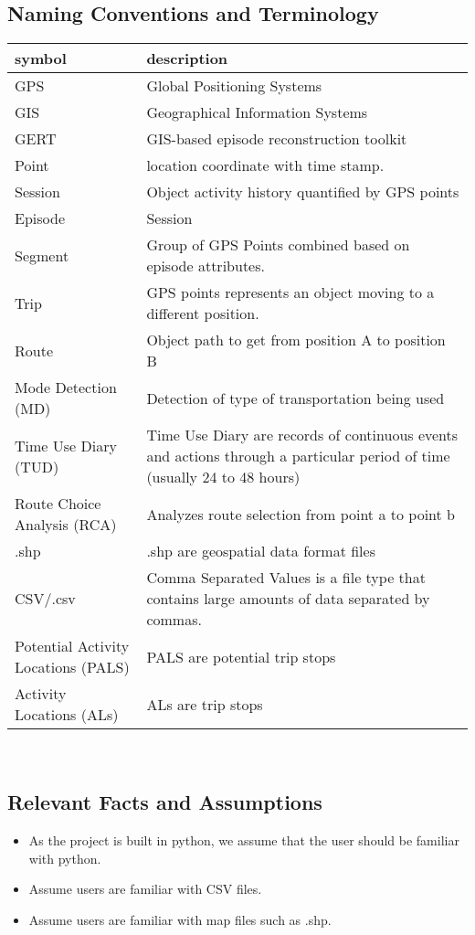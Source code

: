 \documentclass[12pt, titlepage]{article}
\begin{document}
\subsection{Naming Conventions and Terminology}
\begin{tabular}{l p{6cm}} 
  \toprule		
  \textbf{symbol} & \textbf{description}\\
  \midrule 
  GPS & Global Positioning Systems\\
  GIS & Geographical Information Systems\\
  GERT & GIS-based episode reconstruction toolkit \\
  Point & location coordinate with time stamp.\\
  Session & Object activity history quantified by GPS points \\
  Episode & Session\\
  Segment & Group of GPS Points combined based on episode attributes.\\
  Trip & GPS points represents an object moving to a different position.\\
  Route & Object path to get from position A to position B\\
  Mode Detection (MD) & Detection of type of transportation being used \\
  Time Use Diary (TUD) & Time Use Diary are records of continuous events and actions through a particular period of time (usually 24 to 48 hours) \\
  Route Choice Analysis (RCA) &  Analyzes route selection from point a to point b\\
  .shp & .shp are geospatial data format files\\
  CSV/.csv & Comma Separated Values is a file type that contains large amounts of data separated by commas. \\
  Potential Activity Locations (PALS) & PALS are potential trip stops \\
  Activity Locations (ALs) & ALs are trip stops \\


  \bottomrule
\end{tabular}\\

\subsection{Relevant Facts and Assumptions}
\begin{itemize}
    \item As the project is built in python, we assume that the user should be familiar with python.
    \item Assume users are familiar with CSV files.
    \item Assume users are familiar with map files such as .shp.
\end{itemize}
\end{document}
